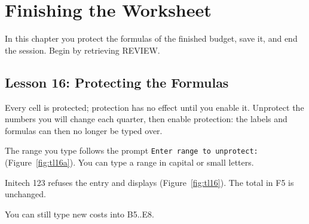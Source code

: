 \chapter{Finishing the Worksheet}

In this chapter you protect the formulas of the finished budget, save it,
and end the session.  Begin by retrieving REVIEW.

\section{Lesson 16: Protecting the Formulas}
Every cell is protected; protection has no effect until you enable it.
Unprotect the numbers you will change each quarter, then enable protection:
the labels and formulas can then no longer be typed over.

\begin{Keystrokes}
\end{Keystrokes}
The range you type follows the prompt \texttt{Enter range to unprotect:}
(Figure~\ref{fig:tl16a}).  You can type a range in capital or small
letters.
\begin{Keystrokes}
\end{Keystrokes}
Initech 123 refuses the entry and displays 
(Figure~\ref{fig:tl16}).  The total in F5 is unchanged.
\begin{Keystrokes}
\end{Keystrokes}
You can still type new costs into B5..E8.


